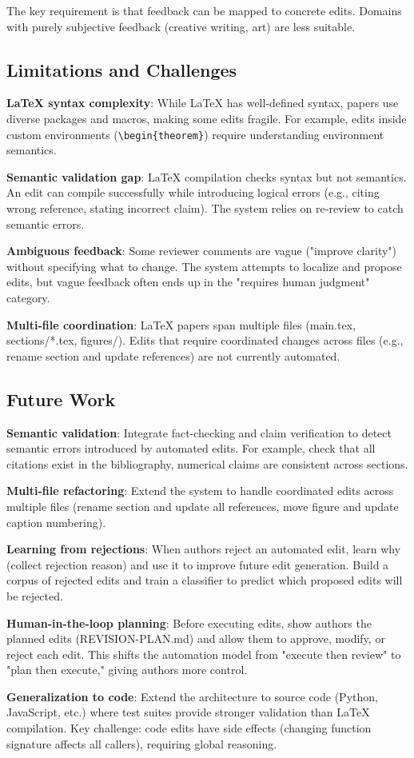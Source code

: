 The key requirement is that feedback can be mapped to concrete edits. Domains with purely subjective feedback (creative writing, art) are less suitable.

\subsection{Limitations and Challenges}

\textbf{LaTeX syntax complexity}: While LaTeX has well-defined syntax, papers use diverse packages and macros, making some edits fragile. For example, edits inside custom environments (\texttt{\textbackslash{}begin\{theorem\}}) require understanding environment semantics.

\textbf{Semantic validation gap}: LaTeX compilation checks syntax but not semantics. An edit can compile successfully while introducing logical errors (e.g., citing wrong reference, stating incorrect claim). The system relies on re-review to catch semantic errors.

\textbf{Ambiguous feedback}: Some reviewer comments are vague ("improve clarity") without specifying what to change. The system attempts to localize and propose edits, but vague feedback often ends up in the "requires human judgment" category.

\textbf{Multi-file coordination}: LaTeX papers span multiple files (main.tex, sections/*.tex, figures/). Edits that require coordinated changes across files (e.g., rename section and update references) are not currently automated.

\subsection{Future Work}

\textbf{Semantic validation}: Integrate fact-checking and claim verification to detect semantic errors introduced by automated edits. For example, check that all citations exist in the bibliography, numerical claims are consistent across sections.

\textbf{Multi-file refactoring}: Extend the system to handle coordinated edits across multiple files (rename section and update all references, move figure and update caption numbering).

\textbf{Learning from rejections}: When authors reject an automated edit, learn why (collect rejection reason) and use it to improve future edit generation. Build a corpus of rejected edits and train a classifier to predict which proposed edits will be rejected.

\textbf{Human-in-the-loop planning}: Before executing edits, show authors the planned edits (REVISION-PLAN.md) and allow them to approve, modify, or reject each edit. This shifts the automation model from "execute then review" to "plan then execute," giving authors more control.

\textbf{Generalization to code}: Extend the architecture to source code (Python, JavaScript, etc.) where test suites provide stronger validation than LaTeX compilation. Key challenge: code edits have side effects (changing function signature affects all callers), requiring global reasoning.